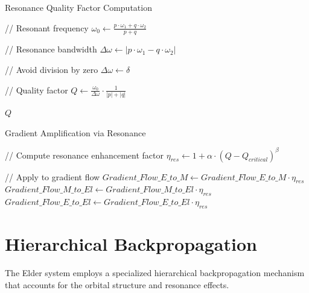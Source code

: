 \begin{algorithm}
\caption{Resonance Quality Factor Computation}
\begin{algorithmic}[1]
    \State // Resonant frequency
    \State $\omega_0 \gets \frac{p \cdot \omega_1 + q \cdot \omega_2}{p + q}$
    
    \State // Resonance bandwidth
    \State $\Delta \omega \gets |p \cdot \omega_1 - q \cdot \omega_2|$
    
    \State // Avoid division by zero
    \If{$\Delta \omega < \delta$}
        \State $\Delta \omega \gets \delta$ 
    \EndIf
    
    \State // Quality factor
    \State $Q \gets \frac{\omega_0}{\Delta \omega} \cdot \frac{1}{|p| + |q|}$
    
    \State \Return $Q$
\EndFunction
\end{algorithmic}
\end{algorithm}

\begin{algorithm}
\caption{Gradient Amplification via Resonance}
\begin{algorithmic}[1]
        \State // Compute resonance enhancement factor
        \State $\eta_{res} \gets 1 + \alpha \cdot (Q - Q_{critical})^{\beta}$
        
        \State // Apply to gradient flow
            \State $Gradient\_Flow\_E\_to\_M \gets Gradient\_Flow\_E\_to\_M \cdot \eta_{res}$
            \State $Gradient\_Flow\_M\_to\_El \gets Gradient\_Flow\_M\_to\_El \cdot \eta_{res}$
            \State $Gradient\_Flow\_E\_to\_El \gets Gradient\_Flow\_E\_to\_El \cdot \eta_{res}$
        \EndIf
    \EndFor
\EndFunction
\end{algorithmic}
\end{algorithm}

\section{Hierarchical Backpropagation}

The Elder system employs a specialized hierarchical backpropagation mechanism that accounts for the orbital structure and resonance effects.

